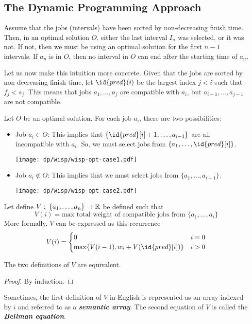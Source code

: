 \subsection{The Dynamic Programming Approach}

Assume that the jobs (intervals) have been sorted by non-decreasing finish time. Then, in an optimal solution $O$, either the last interval $I_n$ was selected, or it was not. If not, then we must be using an optimal solution for the first $n-1$ intervals. If $a_n$ is in $O$, then no interval in $O$ can end after the starting time of $a_n$.

Let us now make this intuition more concrete. Given that the jobs are sorted by non-decreasing finish time, let $\id{pred}(i)$ be the largest index $j < i$ such that $f_j < s_j$. This means that jobs $a_1,\ldots,a_j$ are compatible with $a_i$, but $a_{i+1},\ldots,a_{j-1}$ are not compatible.

Let $O$ be an optimal solution. For each job $a_i$, there are two possibilities:
\begin{itemize}
    \item Job $a_i \in O$: This implies that $\{\id{pred}[i]+1,\ldots,a_{i-1}\}$ are all incompatible with $a_i$. So, we must select jobs from $\{a_1,\ldots,\id{pred}[i]\}$.
    
    \begin{center}
        \texttt{[image: dp/wisp/wisp-opt-case1.pdf]}
    \end{center}

    \item Job $a_i \not\in O$: This implies that we must select jobs from $\{a_1,\ldots,a_{i-1}\}$. 
    
    \begin{center}
        \texttt{[image: dp/wisp/wisp-opt-case2.pdf]}
    \end{center}
\end{itemize}

Let define $V:\; \{a_1,\ldots,a_n\} \to \mathbb{R}$ be defined such that
$$
V(i) = \text{max total weight of compatible jobs from $\{a_1,\ldots,a_i\}$}
$$
More formally, $V$ can be expressed as this recurrence
$$
V(i) = \begin{cases}
    0 & i = 0 \\
    \max \{V(i-1),w_i+V(\id{pred}[i]) \} & i > 0
\end{cases}
$$
\begin{lemma}
    The two definitions of $V$ are equivalent.
\end{lemma}
\begin{proof}
    By induction.
\end{proof}
 
Sometimes, the first definition of $V$ in English is represented as an array indexed by $i$ and referred to as a \textit{\textbf{semantic array}}. The second equation of $V$ is called the \textit{\textbf{Bellman equation}}.

